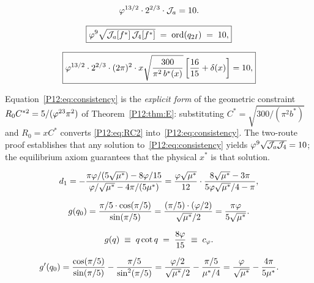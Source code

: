 \begin{equation}
  \varphi^{13/2}\cdot2^{2/3}\cdot\mathcal{J}_a = 10.
  \label{P12:eq:conj_red}
\end{equation}

\begin{equation}
  \boxed{
  \varphi^9\sqrt{\mathcal{J}_a[f^*]\,\mathcal{J}_4[f^*]} \;=\; \operatorname{ord}(q_{2I}) \;=\; 10,
  }
  \label{P12:eq:conjecture}
\end{equation}

\begin{equation}
  \boxed{
  \varphi^{13/2}\cdot2^{2/3}\cdot(2\pi)^2\cdot x
  \sqrt{\frac{300}{\pi^2\,b^*(x)}}
  \left[\frac{16}{15}+\delta(x)\right]
  = 10,}
  \label{P12:eq:consistency}
\end{equation}

\begin{remark}
\label{P12:rem:consistency_equiv}
Equation~\eqref{P12:eq:consistency} is the \emph{explicit form} of the
geometric constraint $R_0 C^{*2}=5/(\varphi^{23}\pi^2)$ of Theorem~\ref{P12:thm:E}:
substituting $C^*=\sqrt{300/(\pi^2 b^*)}$ and $R_0=x C^*$ converts
\eqref{P12:eq:RC2} into~\eqref{P12:eq:consistency}.
The two-route proof establishes that any solution
to~\eqref{P12:eq:consistency} yields $\varphi^9\sqrt{\mathcal{J}_a\mathcal{J}_4}=10$;
the equilibrium axiom guarantees that the physical $x^*$ is that solution.
\end{remark}

\begin{equation}
  d_1
  = -\frac{\pi\varphi/(5\sqrt{\mu^*}) - 8\varphi/15}
          {\varphi/\sqrt{\mu^*} - 4\pi/(5\mu^*)}
  = \frac{\varphi\sqrt{\mu^*}}{12}\cdot
    \frac{8\sqrt{\mu^*}-3\pi}{5\varphi\sqrt{\mu^*}/4-\pi},
  \label{P12:eq:d1_derived}
\end{equation}

\begin{equation}
  g(q_0) = \frac{\pi/5\cdot\cos(\pi/5)}{\sin(\pi/5)}
  = \frac{(\pi/5)\cdot(\varphi/2)}{\sqrt{\mu^*}/2}
  = \frac{\pi\varphi}{5\sqrt{\mu^*}}.
  \label{P12:eq:g_q0}
\end{equation}

\begin{equation}
  g(q) \;\equiv\; q\cot q \;=\; \frac{8\varphi}{15} \;\equiv\; c_\varphi.
  \label{P12:eq:gcot}
\end{equation}

\begin{equation}
  g'(q_0)
  = \frac{\cos(\pi/5)}{\sin(\pi/5)} - \frac{\pi/5}{\sin^2(\pi/5)}
  = \frac{\varphi/2}{\sqrt{\mu^*}/2} - \frac{\pi/5}{\mu^*/4}
  = \frac{\varphi}{\sqrt{\mu^*}} - \frac{4\pi}{5\mu^*}.
  \label{P12:eq:gprime_q0}
\end{equation}

